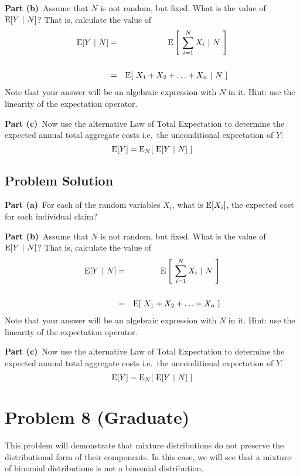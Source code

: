 \documentclass[12pt]{article}
\theoremstyle{definition}
\begin{document}
\bigskip
\noindent
{\bf Part (b)}\ Assume that $N$ is not random, but fixed. What is the value of $\hbox{E}[Y\ |\ N]$? That is, calculate the value of 
\begin{eqnarray*}
\hbox{E}[ Y\ |\ N] & = & \hbox{E} \left [\ \sum_{i=1}^N X_i\ |\ N\ \right ]\\
\\
& = & \hbox{E}[\ X_1 + X_2 + \ldots + X_n\ |\ N\ ]
\end{eqnarray*}
Note that your answer will be an algebraic expression with $N$ in it. Hint: use the linearity of the expectation operator.

\bigskip
\noindent
{\bf Part (c)}\ Now use the alternative Law of Total Expectation to determine the expected annual total aggregate costs i.e.\ the unconditional expectation of $Y$:
$$
\hbox{E}[ Y ] = \hbox{E}_N[\ \hbox{E}[ Y\ |\ N]\ ]
$$

\subsection*{Problem Solution}

\bigskip
\noindent
{\bf Part (a)}\ For each of the random variables $X_i$, what is $\hbox{E}[X_i]$, the expected cost for each individual claim?


\newpage
\noindent
{\bf Part (b)}\ Assume that $N$ is not random, but fixed. What is the value of $\hbox{E}[Y\ |\ N]$? That is, calculate the value of 
\begin{eqnarray*}
	\hbox{E}[ Y\ |\ N] & = & \hbox{E} \left [\ \sum_{i=1}^N X_i\ |\ N\ \right ]\\
	\\
	& = & \hbox{E}[\ X_1 + X_2 + \ldots + X_n\ ]
\end{eqnarray*}
Note that your answer will be an algebraic expression with $N$ in it. Hint: use the linearity of the expectation operator.

\vspace{3in}
\noindent
{\bf Part (c)}\ Now use the alternative Law of Total Expectation to determine the expected annual total aggregate costs i.e.\ the unconditional expectation of $Y$:
$$
\hbox{E}[ Y ] = \hbox{E}_N[\ \hbox{E}[ Y\ |\ N]\ ]
$$

\newpage
\section*{Problem 8 (Graduate)}

This problem will demonstrate that mixture distributions do not preserve the distributional form of their components. In this case, we will see that a mixture of binomial distributions is not a binomial distribution.
\end{document}
